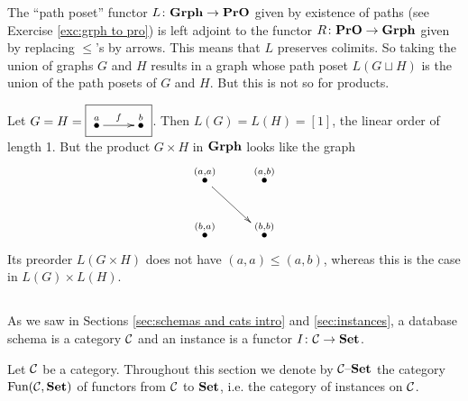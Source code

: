 \documentclass[CT4S-EN-RU]{subfiles}
\begin{document}
\begin{exampleRUS}
\end{exampleRUS}

\begin{exampleENG}
The “path poset” functor $L\colon{\bf Grph}\rightarrow{\bf PrO}$ given by existence of paths (see Exercise \ref{exc:grph to pro}) is left adjoint to the functor $R\colon{\bf PrO}\rightarrow{\bf Grph}$ given by replacing $\leq$'s by arrows. This means that $L$ preserves colimits. So taking the union of graphs $G$ and $H$ results in a graph whose path poset  $L(G\sqcup H)$ is the union of the path posets of $G$ and $H$. But this is not so for products. 

Let $G=H=\fbox{\xymatrix{\LMO{a}\ar[r]^f&\LMO{b}}}$. Then $L(G)=L(H)=[1]$, the linear order of length 1. But the product $G\times H$ in ${\bf Grph}$ looks like the graph 
$$\xymatrix{\LMO{(a,a)}\ar[rd]&\LMO{(a,b)}\\\LMO{(b,a)}&\LMO{(b,b)}}$$
Its preorder $L(G\times H)$ does not have $(a,a)\leq(a,b)$, whereas this is the case in $L(G)\times L(H)$.
\end{exampleENG}

\begin{exampleRUS}
\end{exampleRUS}


\subsection{}\label{sec:data migration}

\begin{blockENG}
As we saw in Sections \ref{sec:schemas and cats intro} and \ref{sec:instances}, a database schema is a category $\mathcal{C}$ and an instance is a functor $I\colon\mathcal{C}\rightarrow{\bf Set}$.  
\end{blockENG}

\begin{blockRUS}
\end{blockRUS}

\begin{notationENG}
Let $\mathcal{C}$ be a category. Throughout this section we denote by $\mathcal{C}{\text \textendash}{\bf Set}$ the category $\textnormal{Fun}(\mathcal{C},{\bf Set})$ of functors from $\mathcal{C}$ to ${\bf Set}$, i.e. the category of instances on $\mathcal{C}$. 
\end{notationENG}

\begin{notationRUS}
\end{notationRUS}
\end{document}
